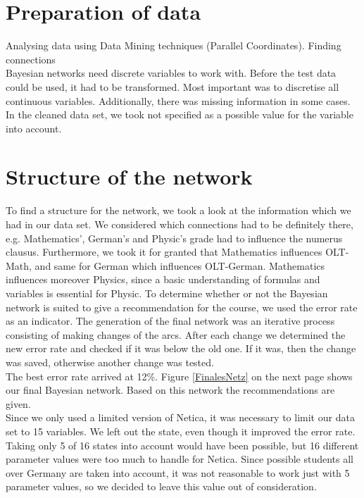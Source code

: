 \documentclass[%
	pdftex,
	oneside,        %
	11pt,           %
	parskip=half,   %
	headsepline,    %
	footsepline,    %
	abstracton,     %
	USenglish,      %
	a4paper,        %
]{report}
\begin{document}
\chapter{Preparation of data}
Analysing data using Data Mining techniques (Parallel Coordinates). Finding connections\\
Bayesian networks need discrete variables to work with. Before the test data could be used, it had to be transformed. Most important was to discretise all continuous variables. Additionally, there was missing information in some cases. In the cleaned data set, we took not specified as a possible value for the variable into account.

\chapter{Structure of the network}
To find a structure for the network, we took a look at the information which we had in our data set. We considered which connections had to be definitely there, e.g. Mathematics', German's and Physic's grade had to influence the numerus clausus. Furthermore, we took it for granted that Mathematics influences OLT-Math, and same for German which influences OLT-German. Mathematics influences moreover Physics, since a basic understanding of formulas and variables is essential for Physic. To determine whether or not the Bayesian network is suited to give a recommendation for the course, we used the error rate as an indicator. The generation of the final network was an iterative process consisting of making changes of the arcs. After each change we determined the new error rate and checked if it was below the old one. If it was, then the change was saved, otherwise another change was tested.\\
The best error rate arrived at 12\%. Figure \ref{FinalesNetz}  on the next page shows our final Bayesian network. Based on this network the recommendations are given.\\
Since we only used a limited version of Netica, it was necessary to limit our data set to 15 variables. We left out the state, even though it improved the error rate. Taking only 5 of 16 states into account would have been possible, but 16 different parameter values were too much to handle for Netica. Since possible students all over Germany are taken into account, it was not reasonable to work just with 5 parameter values, so we decided to leave this value out of consideration.
\end{document}
